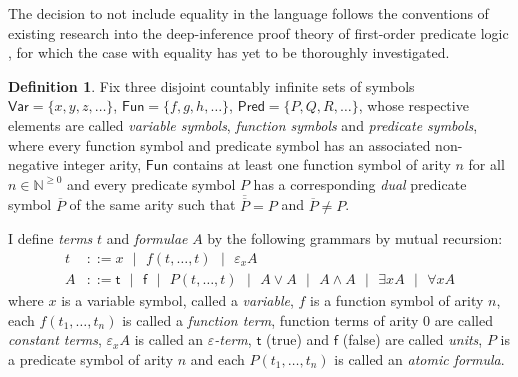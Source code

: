\documentclass[10pt]{article}
\theoremstyle{definition}\newtheorem{remark}[theorem]{Remark}
\theoremstyle{definition}\newtheorem{example}[theorem]{Example}
\theoremstyle{definition}\newtheorem{definition}[theorem]{Definition}
\newcommand{\trueUnit}{\mathsf{t}}
\newcommand{\falseUnit}{\mathsf{f}}
\newcommand{\variablesSet}{\mathsf{Var}}
\newcommand{\functionsSet}{\mathsf{Fun}}
\newcommand{\predicatesSet}{\mathsf{Pred}}
\begin{document}
	The decision to not include equality in the language follows the conventions of existing research into the deep-inference proof theory of first-order predicate logic \cite{BenThesis, KaiThesis, KaiCutElimination}, for which the case with equality has yet to be thoroughly investigated.
	
	\begin{definition}\label{FormulaeDefn}
		Fix three disjoint countably infinite sets of symbols $\variablesSet = \{x, y, z, \dots\}$, $\functionsSet = \{f, g, h, \dots\}$, $\predicatesSet = \{P, Q, R, \dots\}$, whose respective elements are called \textit{variable symbols}, \textit{function symbols} and \textit{predicate symbols}, where every function symbol and predicate symbol has an associated non-negative integer arity, $\functionsSet$ contains at least one function symbol of arity $n$ for all $n \in \mathbb{N}^{\geq 0}$ and every predicate symbol $P$ has a corresponding \textit{dual} predicate symbol $\overline{P}$ of the same arity such that $\overline{\overline{P}} = P$ and $\overline{P} \neq P$.
		
		I define \textit{terms} $t$ and \textit{formulae} $A$ by the following grammars by mutual recursion:
		\begin{align*}
			t &::= x\text{ }|\text{ }f(t, \dots, t)\text{ }|\text{ }\varepsilon_x A\\
			A &::= \trueUnit\text{ }|\text{ }\falseUnit\text{ }|\text{ }P(t, \dots, t)\text{ }|\text{ }A \lor A\text{ }|\text{ }A \land A\text{ }|\text{ }\exists x A\text{ }|\text{ }\forall x A
		\end{align*}
		where $x$ is a variable symbol, called a \textit{variable}, $f$ is a function symbol of arity $n$, each $f(t_1, \dots, t_n)$ is called a \textit{function term}, function terms of arity 0 are called \textit{constant terms}, $\varepsilon_x A$ is called an \textit{$\varepsilon$-term}, $\trueUnit$ (true) and $\falseUnit$ (false) are called \textit{units}, $P$ is a predicate symbol of arity $n$ and each $P(t_1, \dots, t_n)$ is called an \textit{atomic formula}.
	\end{definition}
	
\end{document}
